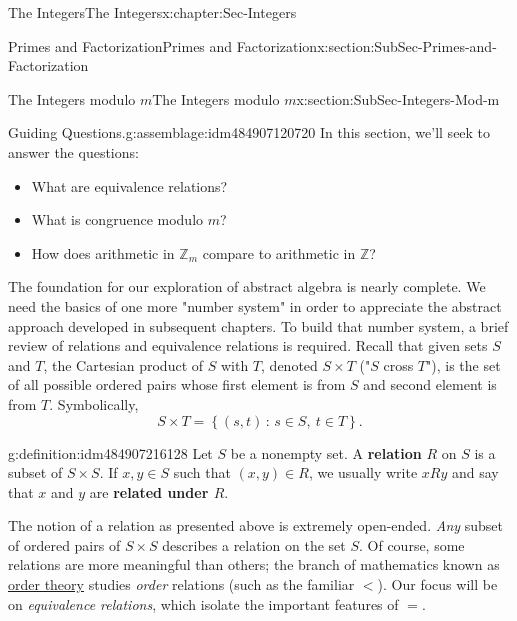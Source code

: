\documentclass[oneside,10pt,]{book}
\newcommand{\terminology}[1]{\textbf{#1}}
\numberwithin{equation}{section}
\newcommand{\setof}[2]{{\left\{#1\,\colon\,#2\right\}}}
\def\Z{{\mathbb Z}}
\newcommand{\lt}{<}
\begin{document}
\begin{chapterptx}{The Integers}{}{The Integers}{}{}{x:chapter:Sec-Integers}
\begin{sectionptx}{Primes and Factorization}{}{Primes and Factorization}{}{}{x:section:SubSec-Primes-and-Factorization}
\end{sectionptx}
%
%
\typeout{************************************************}
\typeout{************************************************}
%
\begin{sectionptx}{The Integers modulo \(m\)}{}{The Integers modulo \(m\)}{}{}{x:section:SubSec-Integers-Mod-m}
\begin{assemblage}{Guiding Questions.}{g:assemblage:idm484907120720}%
In this section, we'll seek to answer the questions: %
\begin{itemize}[label=\textbullet]
\item{}What are equivalence relations?%
\item{}What is congruence modulo \(m\)?%
\item{}How does arithmetic in \(\Z_m\) compare to arithmetic in \(\Z\)?%
\end{itemize}
%
\end{assemblage}
The foundation for our exploration of abstract algebra is nearly complete. We need the basics of one more "number system" in order to appreciate the abstract approach developed in subsequent chapters. To build that number system, a brief review of relations and equivalence relations is required. Recall that given sets \(S\) and \(T\), the Cartesian product of \(S\) with \(T\), denoted \(S\times T\) ("\(S\) cross \(T\)"), is the set of all possible ordered pairs whose first element is from \(S\) and second element is from \(T\). Symbolically,%
%
\begin{equation*}
S\times T = \setof{(s,t)}{s\in S, \ t\in T}.
\end{equation*}
\begin{definition}{}{g:definition:idm484907216128}%
%
Let \(S\) be a nonempty set. A \terminology{relation} \(R\) on \(S\) is a subset of \(S\times S\). If \(x,y\in S\) such that \((x,y)\in R\), we usually write \(xRy\) and say that \(x\) and \(y\) are \terminology{related under \(R\)}.%
\end{definition}
The notion of a relation as presented above is extremely open-ended. \emph{Any} subset of ordered pairs of \(S\times S\) describes a relation on the set \(S\). Of course, some relations are more meaningful than others; the branch of mathematics known as \href{https://en.wikipedia.org/wiki/Order_theory}{order theory} studies \emph{order} relations (such as the familiar \(\lt\)). Our focus will be on \emph{equivalence relations}, which isolate the important features of \(=\).%

\end{sectionptx}
\end{chapterptx}
\end{document}
